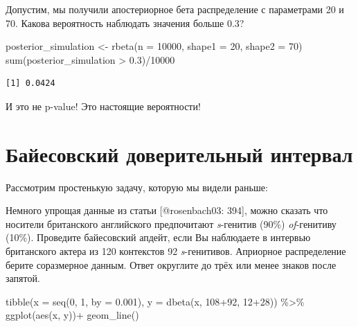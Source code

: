 \documentclass[
]{book}
\makeatletter
\newenvironment{Shaded}{\begin{snugshade}}{\end{snugshade}}
\newcommand{\AttributeTok}[1]{\textcolor[rgb]{0.77,0.63,0.00}{#1}}
\newcommand{\DecValTok}[1]{\textcolor[rgb]{0.00,0.00,0.81}{#1}}
\newcommand{\FloatTok}[1]{\textcolor[rgb]{0.00,0.00,0.81}{#1}}
\newcommand{\FunctionTok}[1]{\textcolor[rgb]{0.00,0.00,0.00}{#1}}
\newcommand{\NormalTok}[1]{#1}
\newcommand{\OtherTok}[1]{\textcolor[rgb]{0.56,0.35,0.01}{#1}}
\newcommand{\SpecialCharTok}[1]{\textcolor[rgb]{0.00,0.00,0.00}{#1}}
\newenvironment{kframe}{%
    \medskip{}
    \setlength{\fboxsep}{.8em}
    \def\at@end@of@kframe{}%
    \ifinner\ifhmode%
    \def\at@end@of@kframe{\end{minipage}}%
    \begin{minipage}{\columnwidth}%
    \fi\fi%
    \def\FrameCommand##1{\hskip\@totalleftmargin \hskip-\fboxsep
    \colorbox{shadecolor}{##1}\hskip-\fboxsep
        \hskip-\linewidth \hskip-\@totalleftmargin \hskip\columnwidth}%
    \MakeFramed {\advance\hsize-\width
      \@totalleftmargin\z@ \linewidth\hsize
      \@setminipage}}%
  {\par\unskip\endMakeFramed%
    \at@end@of@kframe}
\newenvironment{rmdblock}[1]
  {
    \begin{itemize}
    \renewcommand{\labelitemi}{
      \raisebox{-.7\height}[0pt][0pt]{
        {\setkeys{Gin}{width=3em,keepaspectratio}\texttt{[image: images/\#1]}}
        }
        }
        \setlength{\fboxsep}{1em}
        \begin{kframe}
        \item
      }
      {
        \end{kframe}
        \end{itemize}
      }
\newenvironment{rmdtask}
      {\begin{rmdblock}{task}}
      {\end{rmdblock}}
\makeatother
\begin{document}
Допустим, мы получили апостериорное бета распределение с параметрами 20 и 70. Какова вероятность наблюдать значения больше 0.3?

\begin{Shaded}
\begin{Highlighting}[]
\NormalTok{posterior\_simulation }\OtherTok{\textless{}{-}} \FunctionTok{rbeta}\NormalTok{(}\AttributeTok{n =} \DecValTok{10000}\NormalTok{, }\AttributeTok{shape1 =} \DecValTok{20}\NormalTok{, }\AttributeTok{shape2 =} \DecValTok{70}\NormalTok{)}
\FunctionTok{sum}\NormalTok{(posterior\_simulation }\SpecialCharTok{\textgreater{}} \FloatTok{0.3}\NormalTok{)}\SpecialCharTok{/}\DecValTok{10000}
\end{Highlighting}
\end{Shaded}

\begin{verbatim}
[1] 0.0424
\end{verbatim}

И это не p-value! Это настоящие вероятности!

\hypertarget{ux431ux430ux439ux435ux441ux43eux432ux441ux43aux438ux439-ux434ux43eux432ux435ux440ux438ux442ux435ux43bux44cux43dux44bux439-ux438ux43dux442ux435ux440ux432ux430ux43b}{%
\chapter{Байесовский доверительный интервал}\label{ux431ux430ux439ux435ux441ux43eux432ux441ux43aux438ux439-ux434ux43eux432ux435ux440ux438ux442ux435ux43bux44cux43dux44bux439-ux438ux43dux442ux435ux440ux432ux430ux43b}}

Рассмотрим простенькую задачу, которую мы видели раньше:

\begin{rmdtask}
Немного упрощая данные из статьи {[}@rosenbach03: 394{]}, можно сказать
что носители британского английского предпочитают \emph{s}-генитив
(90\%) \emph{of}-генитиву (10\%). Проведите байесовский апдейт, если Вы
наблюдаете в интервью британского актера из 120 контекстов 92
\emph{s}-генитивов. Априорное распределение берите соразмерное данным.
Ответ округлите до трёх или менее знаков после запятой.
\end{rmdtask}

\begin{Shaded}
\begin{Highlighting}[]
\FunctionTok{tibble}\NormalTok{(}\AttributeTok{x =} \FunctionTok{seq}\NormalTok{(}\DecValTok{0}\NormalTok{, }\DecValTok{1}\NormalTok{, }\AttributeTok{by =} \FloatTok{0.001}\NormalTok{),}
       \AttributeTok{y =} \FunctionTok{dbeta}\NormalTok{(x, }\DecValTok{108}\SpecialCharTok{+}\DecValTok{92}\NormalTok{, }\DecValTok{12}\SpecialCharTok{+}\DecValTok{28}\NormalTok{)) }\SpecialCharTok{\%\textgreater{}\%} 
  \FunctionTok{ggplot}\NormalTok{(}\FunctionTok{aes}\NormalTok{(x, y))}\SpecialCharTok{+}
  \FunctionTok{geom\_line}\NormalTok{()}
\end{Highlighting}
\end{Shaded}
\end{document}
